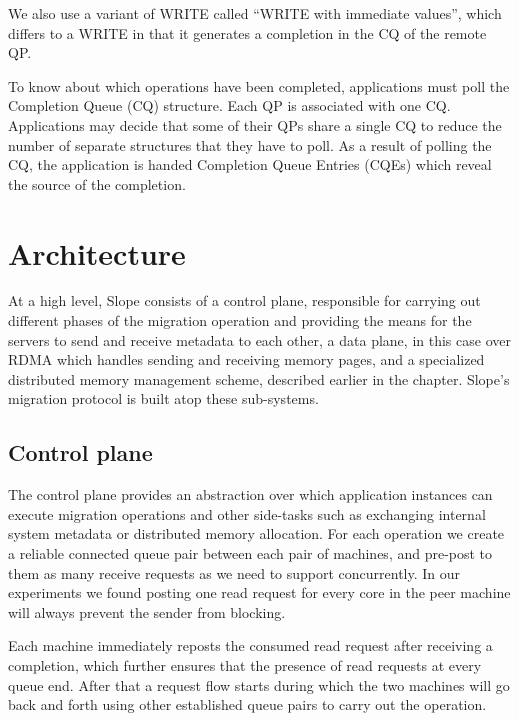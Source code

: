 We also use a variant of WRITE called ``WRITE with immediate values'', which
differs to a WRITE in that it generates a completion in the CQ of the
remote QP.

To know about which operations have been completed, applications must poll the
Completion Queue (CQ) structure.
Each QP is associated with one CQ. Applications may decide that some of their
QPs share a single CQ to reduce the number of separate structures that they
have to poll. As a result of polling the CQ, the application is handed
Completion Queue Entries (CQEs) which reveal the source of the completion.


\section{Architecture}
At a high level, Slope consists of a control plane, responsible for carrying out
different phases of the migration operation and providing the means for the
servers to send and receive metadata to each other, a data plane, in this case
over RDMA which handles sending and receiving memory pages,
and a specialized distributed memory management scheme, described earlier in the
chapter. Slope's migration protocol is built atop these sub-systems.


\subsection{Control plane}
The control plane provides an abstraction over which application instances can
execute migration operations and other side-tasks such as exchanging internal
system metadata or distributed memory allocation. For each operation we create
a reliable connected queue pair between each pair of machines, and pre-post to
them as many receive requests as we need to support concurrently. In our
experiments we found posting one read request for every core in the peer machine
will always prevent the sender from blocking.

Each machine immediately reposts
the consumed read request after receiving a completion, which further ensures
that the presence of read requests at every queue end. After that a request
flow starts during which the two machines will go back and forth using other
established queue pairs to carry out the operation.

